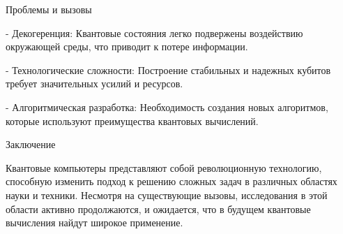 \documentclass[exam_answers.tex]{subfiles}
\begin{document}
Проблемы и вызовы

- Декогеренция: Квантовые состояния легко подвержены воздействию окружающей среды, что приводит к потере информации.

- Технологические сложности: Построение стабильных и надежных кубитов требует значительных усилий и ресурсов.

- Алгоритмическая разработка: Необходимость создания новых алгоритмов, которые используют преимущества квантовых вычислений.

Заключение

Квантовые компьютеры представляют собой революционную технологию, способную изменить подход к решению сложных задач в различных областях науки и техники. Несмотря на существующие вызовы, исследования в этой области активно продолжаются, и ожидается, что в будущем квантовые вычисления найдут широкое применение.
\end{document}
